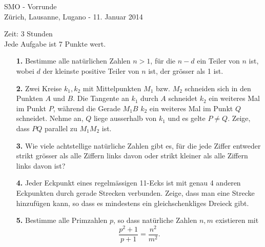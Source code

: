 \documentclass[11pt,a4paper]{article}
\begin{document}
\pagestyle{empty}

\begin{center}
{\huge SMO - Vorrunde} \\
\medskip Zürich, Lausanne, Lugano - 11. Januar 2014
\end{center}
\vspace{8mm}
Zeit: 3 Stunden\\
Jede Aufgabe ist 7 Punkte wert.

\vspace{15mm}

\begin{enumerate}

\item[\textbf{1.}] 
Bestimme alle natürlichen Zahlen $n>1$, für die $n-d$ ein Teiler von $n$ ist, wobei $d$ der kleinste positive Teiler von $n$ ist, der grösser als 1 ist.

\bigskip

\item[\textbf{2.}] 
Zwei Kreise $k_1,k_2$ mit Mittelpunkten $M_1$ bzw. $M_2$ schneiden sich in den Punkten $A$ und $B$. Die Tangente an $k_1$ durch $A$ schneidet $k_2$ ein weiteres Mal im Punkt $P$, während die Gerade $M_1B$ $k_2$ ein weiteres Mal im Punkt $Q$ schneidet. Nehme an, $Q$ liege ausserhalb von $k_1$ und es gelte $P\neq Q$. Zeige, dass $PQ$ parallel zu $M_1M_2$ ist.

\bigskip

\item[\textbf{3.}]
Wie viele achtstellige natürliche Zahlen gibt es, für die jede Ziffer entweder strikt grösser als alle Ziffern links davon oder strikt kleiner als alle Ziffern links davon ist?

\bigskip

\item[\textbf{4.}]
Jeder Eckpunkt eines regelmässigen 11-Ecks ist mit genau 4 anderen Eckpunkten durch gerade Strecken verbunden. Zeige, dass man eine Strecke hinzufügen kann, so dass es mindestens ein gleichschenkliges Dreieck gibt. 

\bigskip

\item[\textbf{5.}] 
Bestimme alle Primzahlen $p$, so dass natürliche Zahlen $n,m$ existieren mit
\[
\frac{p^2+1}{p+1} = \frac{n^2}{m^2}.
\]

\bigskip

\end{enumerate}

\vspace{1.5cm}

\end{document}
